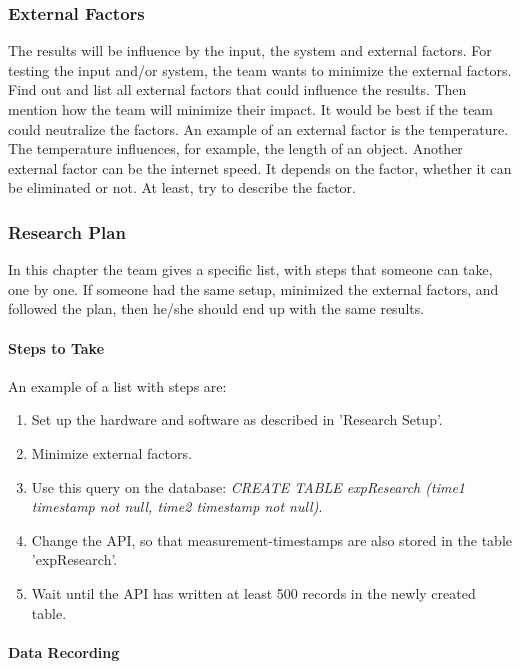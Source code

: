 \documentclass[10pt]{report}
\begin{document}
\subsubsection{External Factors}

The results will be influence by the input, the system and external factors. For testing the input and/or system, the team wants to minimize the external factors. Find out and list all external factors that could influence the results. Then mention how the team will minimize their impact. It would be best if the team could neutralize the factors. An example of an external factor is the temperature. The temperature influences, for example, the length of an object. Another external factor can be the internet speed. It depends on the factor, whether it can be eliminated or not. At least, try to describe the factor.

\subsubsection{Research Plan}

In this chapter the team gives a specific list, with steps that someone can take, one by one. If someone had the same setup, minimized the external factors, and followed the plan, then he/she should end up with the same results.

\paragraph{Steps to Take}

An example of a list with steps are:

\begin{enumerate}
	\item Set up the hardware and software as described in 'Research Setup'.
	\item Minimize external factors.
	\item Use this query on the database: \textit{CREATE TABLE expResearch (time1 timestamp not null, time2 timestamp not null)}.
	\item Change the API, so that measurement-timestamps are also stored in the table 'expResearch'. 
	\item Wait until the API has written at least 500 records in the newly created table.
\end{enumerate}

\paragraph{Data Recording}
\end{document}
